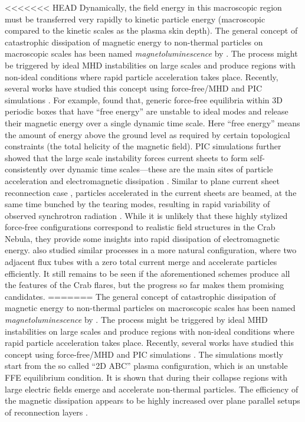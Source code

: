<<<<<<< HEAD
Dynamically, the field energy in this macroscopic region must be transferred very rapidly to kinetic particle energy (macroscopic compared to the kinetic scales as the plasma skin depth). The general concept of catastrophic dissipation of magnetic energy to non-thermal particles on macroscopic scales has been named \textit{magnetoluminescence} by \citet{Blandford_2014}. The process might be triggered by ideal MHD instabilities on large scales and produce regions with non-ideal conditions where rapid particle acceleration takes place. Recently, several works have studied this concept using force-free/MHD \citep{East_2015,2016arXiv160305731L,Zrake_2016} and PIC simulations \citep{2016arXiv160305731L,Nalewajko_2016,Yuan_2016}. For example, \citet{East_2015} found that, generic force-free equilibria within 3D periodic boxes that have ``free energy'' are unstable to ideal modes and release their magnetic energy over a single dynamic time scale. Here ``free energy'' means the amount of energy above the ground level as required by certain topological constraints (the total helicity of the magnetic field). PIC simulations further showed that the large scale instability forces current sheets to form self-consistently over dynamic time scales---these are the main sites of particle acceleration and electromagnetic dissipation \citep{2016arXiv160305731L,Nalewajko_2016,Yuan_2016}. Similar to plane current sheet reconnection case \cite{Cerutti_2013,Cerutti_2014}, particles accelerated in the current sheets are beamed, at the same time bunched by the tearing modes, resulting in rapid variability of observed synchrotron radiation \citep{Yuan_2016}. While it is unlikely that these highly stylized force-free configurations correspond to realistic field structures in the Crab Nebula, they provide some insights into rapid dissipation of electromagnetic energy. \citet{2016arXiv160305731L} also studied similar processes in a more natural configuration, where two adjacent flux tubes with a zero total current merge and accelerate particles efficiently. It still remains to be seen if the aforementioned schemes produce all the features of the Crab flares, but the progress so far makes them promising candidates.
=======
The general concept of catastrophic dissipation of magnetic energy to non-thermal particles on macroscopic scales has been named \textit{magnetoluminescence} by \citet{Blandford_2014}. The process might be  triggered by ideal MHD instabilities on large scales and produce regions with non-ideal conditions where rapid particle acceleration takes place. Recently, several works have studied this concept using force-free/MHD \citep{East_2015,2016arXiv160305731L,Zrake_2016} and PIC simulations \citep{2016arXiv160305731L,2016arXiv160403179Y,Nalewajko_2016}. The simulations mostly start from the so called ``2D ABC'' plasma configuration, which is an unstable FFE equilibrium condition. It is shown that during their collapse regions with large electric fields emerge and accelerate non-thermal particles. The efficiency of the magnetic dissipation appears to be highly increased over plane parallel setups of reconnection layers \citep{Cerutti_2014}. 

